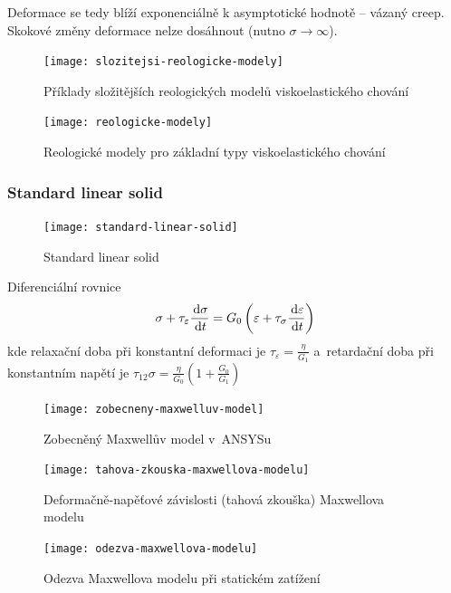 Deformace se tedy blíží exponenciálně k asymptotické hodnotě -- vázaný creep.
Skokové změny deformace nelze dosáhnout (nutno $\sigma \rightarrow \infty$).

\begin{figure}[H]
	\centering
	\texttt{[image: slozitejsi-reologicke-modely]}
	\caption{Příklady složitějších reologických modelů viskoelastického chování}
	\label{fig:slozitejsi-reologicke-modely}
\end{figure}

\begin{figure}[H]
	\centering
	\texttt{[image: reologicke-modely]}
	\caption{Reologické modely pro základní typy viskoelastického chování}
	\label{fig:reologicke-modely}
\end{figure}

\subsubsection{Standard linear solid}
\begin{figure}[H]
	\centering
	\texttt{[image: standard-linear-solid]}
	\caption{Standard linear solid}
	\label{fig:standard-linear-solid}
\end{figure}

Diferenciální rovnice
\begin{equation}
	\sigma + \tau_\varepsilon \frac{\,\mathrm{d} \sigma}{\,\mathrm{d} t} = G_0 \left(\varepsilon + \tau_\sigma \frac{\,\mathrm{d} \varepsilon}{\,\mathrm{d} t}\right)
\end{equation}
kde relaxační doba při konstantní deformaci je $\tau_\varepsilon = \frac{\eta}{G_1}$ a~retardační doba při konstantním napětí je $\tau_{12}\sigma = \frac{\eta}{G_0} \left(1 + \frac{G_0}{G_1}\right)$

\begin{figure}[H]
	\centering
	\texttt{[image: zobecneny-maxwelluv-model]}
	\caption{Zobecněný Maxwellův model v~ANSYSu}
	\label{fig:zobecneny-maxwelluv-model}
\end{figure}

\begin{figure}[H]
	\centering
	\texttt{[image: tahova-zkouska-maxwellova-modelu]}
	\caption{Deformačně-napěťové závislosti (tahová zkouška) Maxwellova modelu}
	\label{fig:tahova-zkouska-maxwellova-modelu}
\end{figure}

\begin{figure}[H]
	\centering
	\texttt{[image: odezva-maxwellova-modelu]}
	\caption{Odezva Maxwellova modelu při statickém zatížení}
	\label{fig:odezva-maxwellova-modelu}
\end{figure}

